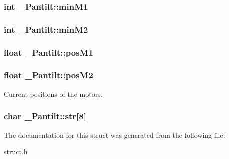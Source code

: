 \subsubsection[{\texorpdfstring{min\+M1}{minM1}}]{\setlength{\rightskip}{0pt plus 5cm}int \+\_\+\+Pantilt\+::min\+M1}\hypertarget{struct___pantilt_adf84d6bc2232f3b4bc0f083ba9fb7d6e}{}\label{struct___pantilt_adf84d6bc2232f3b4bc0f083ba9fb7d6e}
\subsubsection[{\texorpdfstring{min\+M2}{minM2}}]{\setlength{\rightskip}{0pt plus 5cm}int \+\_\+\+Pantilt\+::min\+M2}\hypertarget{struct___pantilt_a699ffbddf43d385ee176a11ed0824483}{}\label{struct___pantilt_a699ffbddf43d385ee176a11ed0824483}
\subsubsection[{\texorpdfstring{pos\+M1}{posM1}}]{\setlength{\rightskip}{0pt plus 5cm}float \+\_\+\+Pantilt\+::pos\+M1}\hypertarget{struct___pantilt_a176de6650a3e2cd0b1a368341113c6be}{}\label{struct___pantilt_a176de6650a3e2cd0b1a368341113c6be}
\subsubsection[{\texorpdfstring{pos\+M2}{posM2}}]{\setlength{\rightskip}{0pt plus 5cm}float \+\_\+\+Pantilt\+::pos\+M2}\hypertarget{struct___pantilt_a3db337f00d74f2f7d2d4a566fa752864}{}\label{struct___pantilt_a3db337f00d74f2f7d2d4a566fa752864}
Current positions of the motors. 
\subsubsection[{\texorpdfstring{str}{str}}]{\setlength{\rightskip}{0pt plus 5cm}char \+\_\+\+Pantilt\+::str\mbox{[}8\mbox{]}}\hypertarget{struct___pantilt_ac1ef92bf2930646a3950cbe0b426b30d}{}\label{struct___pantilt_ac1ef92bf2930646a3950cbe0b426b30d}


The documentation for this struct was generated from the following file\+:\begin{DoxyCompactItemize}
\item 
\hyperlink{struct_8h}{struct.\+h}\end{DoxyCompactItemize}

